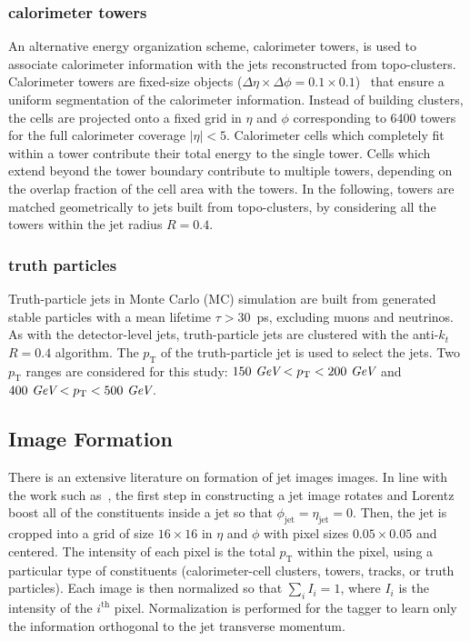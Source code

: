 \subsubsection{calorimeter towers}
An alternative energy organization scheme, calorimeter towers,
is used to associate calorimeter information with the jets
reconstructed from topo-clusters.
Calorimeter towers are fixed-size objects ($\Delta\eta\times\Delta\phi=0.1\times0.1$)~\cite{cscbook}
that ensure a uniform segmentation of the calorimeter information.
Instead of building clusters, the cells are projected onto a fixed grid in $\eta$ and $\phi$ corresponding to 6400 towers
for the full calorimeter coverage $|\eta|<5$.
Calorimeter cells which completely fit within a tower contribute their total energy
to the single tower.
Cells which extend beyond the tower boundary contribute to multiple
towers, depending on the overlap fraction of the cell area with the towers.
In the following, towers are matched geometrically to jets built from topo-clusters, by considering all the towers within
the jet radius $R=0.4$.

\subsubsection{truth particles}
Truth-particle jets in Monte Carlo (MC) simulation are built from generated stable particles with a mean lifetime $\tau>30$~ps, 
excluding muons and neutrinos.
As with the detector-level jets, truth-particle jets are clustered with the anti-$k_t$ $R=0.4$ algorithm.
The $p_\text{T}$ of the truth-particle jet is used to select the jets.
Two $p_\text{T}$ ranges are considered for this study: $150~\textit{GeV}<p_\text{T}<200~\textit{GeV}$ and $400~\textit{GeV}<p_\text{T}<500~\textit{GeV}$.


\subsection{Image Formation}

There is an extensive literature on formation of jet images images. In line with the work such as~\cite{Cogan:2014oua,Almeida:2015jua}, the first step in constructing a jet image rotates and Lorentz boost all of the constituents inside a jet so that $\phi_\text{jet}=\eta_\text{jet}=0$. Then, the jet is cropped into a grid of size $16\times 16$ in $\eta$ and $\phi$ with pixel sizes $0.05\times 0.05$ and centered.  The intensity of each pixel is the total $p_\text{T}$ within the pixel, using a particular type of constituents (calorimeter-cell clusters, towers, tracks, or truth particles). Each image is then normalized so that $\sum_i I_i=1$, where $I_i$ is the intensity of the $i^\text{th}$ pixel. Normalization is performed for the tagger to learn only the information orthogonal to the jet transverse momentum.  %

